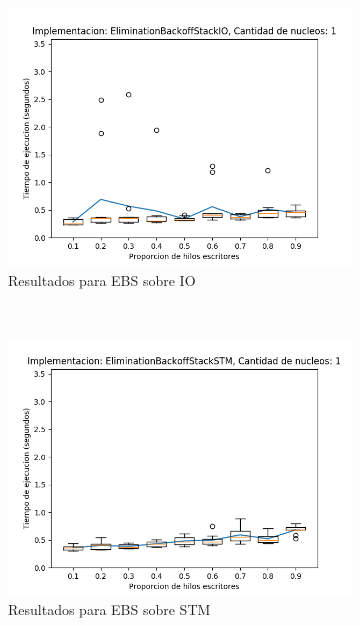 \begin{appendices}
\begin{figure}[t]
    \centering
    \begin{subfigure}[b]{0.49\textwidth}
        \includegraphics[width=\textwidth]{images/pushPercentages/plots/expEBSIO-1}
        \caption{Resultados para EBS sobre IO}
        \label{subfig:pushPercentages-ebsio-1}
    \end{subfigure}
    ~
    \begin{subfigure}[b]{0.49\textwidth}
        \includegraphics[width=\textwidth]{images/pushPercentages/plots/expEBSSTM-1}
        \caption{Resultados para EBS sobre STM}
        \label{subfig:pushPercentages-ebsstm-1}
    \end{subfigure}
    \begin{subfigure}[b]{0.49\textwidth}

\end{subfigure}
\end{figure}
\end{appendices}
